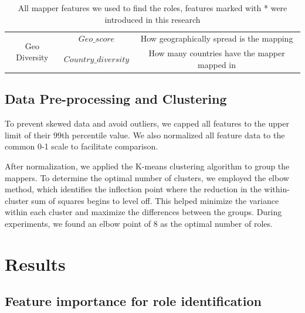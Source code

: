 \documentclass[manuscript,screen,review]{acmart}
\begin{document}
\begin{table}[h!]
\begin{tabular}{ccc}
\multirow{2}{*}{Geo Diversity}     & $Geo\_score$                & How geographically spread is the mapping                                                          \\ \cline{2-3} 
                                   & $Country\_diversity$        & How many countries have the mapper mapped in                                                              \\ \hline
\end{tabular}
\caption{All mapper features we used to find the roles, features marked with * were introduced in this research}
\label{mapper-feature}
\end{table}

\subsection{Data Pre-processing and Clustering}

To prevent skewed data and avoid outliers, we capped all features to the upper limit of their 99th percentile value. We also normalized all feature data to the common 0-1 scale to facilitate comparison.

After normalization, we applied the K-means clustering algorithm to group the mappers. To determine the optimal number of clusters, we employed the elbow method, which identifies the inflection point where the reduction in the within-cluster sum of squares begins to level off. This helped minimize the variance within each cluster and maximize the differences between the groups. During experiments, we found an elbow point of 8 as the optimal number of roles.

\section{Results}

\subsection{Feature importance for role identification}
\end{document}
